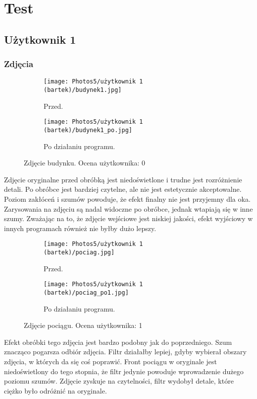 \documentclass[]{mwart}
\begin{document}
\newpage
\section{Test}
\subsection{Użytkownik 1}

\subsubsection{Zdjęcia}

\begin{figure}[h!]
    \centering
    \begin{subfigure}[b]{0.49\textwidth}
        \centering
        \texttt{[image: Photos5/użytkownik 1 (bartek)/budynek1.jpg]}
        \caption{Przed.}
    \end{subfigure}
    \hfill
    \begin{subfigure}[b]{0.49\textwidth}
        \centering
        \texttt{[image: Photos5/użytkownik 1 (bartek)/budynek1\_po.jpg]}
        \caption{Po działaniu programu.}
    \end{subfigure}
    \caption{Zdjęcie budynku. Ocena użytkownika: 0}
\end{figure}
Zdjęcie oryginalne przed obróbką jest niedoświetlone i trudne jest rozróżnienie detali. Po obróbce jest bardziej czytelne, ale nie jest estetycznie akceptowalne. Poziom zakłóceń i szumów powoduje, że efekt finalny nie jest przyjemny dla oka. Zarysowania na zdjęciu są nadal widoczne po obróbce, jednak wtapiają się w inne szumy. Zważając na to, że zdjęcie wejściowe jest niskiej jakości, efekt wyjściowy w innych programach również nie byłby dużo lepszy.


\begin{figure}[h!]
    \centering
    \begin{subfigure}[b]{0.49\textwidth}
        \centering
        \texttt{[image: Photos5/użytkownik 1 (bartek)/pociag.jpg]}
        \caption{Przed.}
    \end{subfigure}
    \hfill
    \begin{subfigure}[b]{0.49\textwidth}
        \centering
        \texttt{[image: Photos5/użytkownik 1 (bartek)/pociag\_po1.jpg]}
        \caption{Po działaniu programu.}
    \end{subfigure}
    \caption{Zdjęcie pociągu. Ocena użytkownika: 1    }
\end{figure}
Efekt obróbki tego zdjęcia jest bardzo podobny jak do poprzedniego. Szum znacząco pogarsza odbiór zdjęcia. Filtr działałby lepiej, gdyby wybierał obszary zdjęcia, w których da się coś poprawić. Front pociągu w oryginale jest niedoświetlony do tego stopnia, że filtr jedynie powoduje wprowadzenie dużego poziomu szumów. Zdjęcie zyskuje na czytelności, filtr wydobył detale, które ciężko było odróżnić na oryginale.
\end{document}
